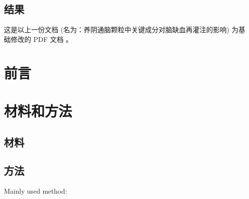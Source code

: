 \documentclass[
]{article}
\begin{document}
\hypertarget{ux7ed3ux679c}{%
\subsection{结果}\label{ux7ed3ux679c}}

这是以上一份文档 (名为：养阴通脑颗粒中关键成分对脑缺血再灌注的影响) 为基础修改的 PDF 文档 。

\hypertarget{introduction}{%
\section{前言}\label{introduction}}

\hypertarget{methods}{%
\section{材料和方法}\label{methods}}

\hypertarget{ux6750ux6599}{%
\subsection{材料}\label{ux6750ux6599}}

\hypertarget{ux65b9ux6cd5}{%
\subsection{方法}\label{ux65b9ux6cd5}}

Mainly used method:
\end{document}
